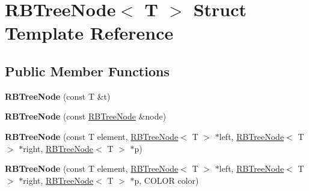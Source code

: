 \hypertarget{structRBTreeNode}{}\section{R\+B\+Tree\+Node$<$ T $>$ Struct Template Reference}
\label{structRBTreeNode}
\subsection*{Public Member Functions}
\begin{DoxyCompactItemize}
\item 
\mbox{\label{structRBTreeNode_aae4119573b6ce9f44289cbeaa225775a}} 
{\bfseries R\+B\+Tree\+Node} (const T \&t)
\item 
\mbox{\label{structRBTreeNode_a753595687f5adeef15b0b08813d86023}} 
{\bfseries R\+B\+Tree\+Node} (const \hyperlink{structRBTreeNode}{R\+B\+Tree\+Node} \&node)
\item 
\mbox{\label{structRBTreeNode_a3623d833c4682c8a6b7437ae8e6bd1c9}} 
{\bfseries R\+B\+Tree\+Node} (const T element, \hyperlink{structRBTreeNode}{R\+B\+Tree\+Node}$<$ T $>$ $\ast$left, \hyperlink{structRBTreeNode}{R\+B\+Tree\+Node}$<$ T $>$ $\ast$right, \hyperlink{structRBTreeNode}{R\+B\+Tree\+Node}$<$ T $>$ $\ast$p)
\item 
\mbox{\label{structRBTreeNode_a11f770591252473508eea8ad1b6dff55}} 
{\bfseries R\+B\+Tree\+Node} (const T element, \hyperlink{structRBTreeNode}{R\+B\+Tree\+Node}$<$ T $>$ $\ast$left, \hyperlink{structRBTreeNode}{R\+B\+Tree\+Node}$<$ T $>$ $\ast$right, \hyperlink{structRBTreeNode}{R\+B\+Tree\+Node}$<$ T $>$ $\ast$p, C\+O\+L\+OR color)
\end{DoxyCompactItemize}
